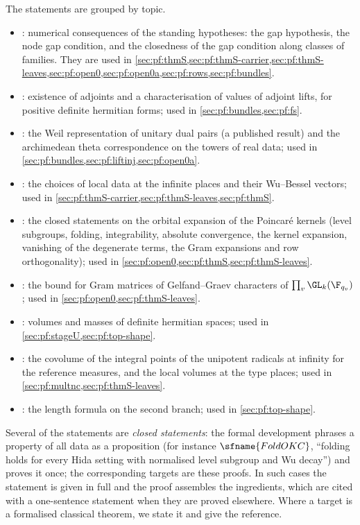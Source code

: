 The statements are grouped by topic.
\begin{itemize}
\item {}: numerical consequences of the standing hypotheses: the gap hypothesis, the node gap
condition, and the closedness of the gap condition along classes of families. They are used in
\cref{sec:pf:thmS,sec:pf:thmS-carrier,sec:pf:thmS-leaves,sec:pf:open0,sec:pf:open0a,sec:pf:rows,sec:pf:bundles}.
\item {}: existence of adjoints and a characterisation of values of adjoint lifts, for
positive definite hermitian forms; used in \cref{sec:pf:bundles,sec:pf:fs}.
\item {}: the Weil representation of unitary dual pairs (a published result) and the
archimedean theta correspondence on the towers of real data; used in
\cref{sec:pf:bundles,sec:pf:liftinj,sec:pf:open0a}.
\item {}: the choices of local data at the infinite places and their Wu--Bessel vectors; used
in \cref{sec:pf:thmS-carrier,sec:pf:thmS-leaves,sec:pf:thmS}.
\item {}: the closed statements on the orbital expansion of the Poincar\'e kernels (level
subgroups, folding, integrability, absolute convergence, the kernel expansion, vanishing of the degenerate terms, the
Gram expansions and row orthogonality); used in \cref{sec:pf:open0,sec:pf:thmS,sec:pf:thmS-leaves}.
\item {}: the bound for Gram matrices of Gelfand--Graev characters of $\prod_v\GL_k(\F_{q_v})$;
used in \cref{sec:pf:open0,sec:pf:thmS-leaves}.
\item {}: volumes and masses of definite hermitian spaces; used in
\cref{sec:pf:stageU,sec:pf:top-shape}.
\item {}: the covolume of the integral points of the unipotent radicals at infinity for the
reference measures, and the local volumes at the type places; used in \cref{sec:pf:multnc,sec:pf:thmS-leaves}.
\item {}: the length formula on the second branch; used in \cref{sec:pf:top-shape}.
\end{itemize}
Several of the statements are \emph{closed statements}: the formal development phrases a property of all data as a
proposition (for instance $\sfname{FoldOKC}$, ``folding holds for every Hida setting with normalised level subgroup and
Wu decay'') and proves it once; the corresponding targets are these proofs. In such
cases the statement is given in full and the proof assembles the ingredients, which are cited with a one-sentence
statement when they are proved elsewhere. Where a target is a formalised classical theorem, we state it and give the
reference.

